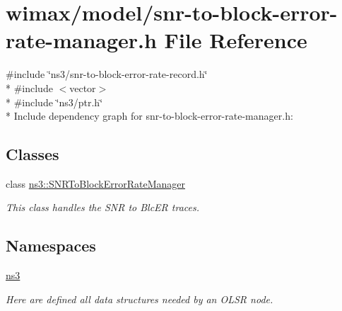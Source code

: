 \hypertarget{snr-to-block-error-rate-manager_8h}{}\section{wimax/model/snr-\/to-\/block-\/error-\/rate-\/manager.h File Reference}
\label{snr-to-block-error-rate-manager_8h}
{\ttfamily \#include \char`\"{}ns3/snr-\/to-\/block-\/error-\/rate-\/record.\+h\char`\"{}}\\*
{\ttfamily \#include $<$vector$>$}\\*
{\ttfamily \#include \char`\"{}ns3/ptr.\+h\char`\"{}}\\*
Include dependency graph for snr-\/to-\/block-\/error-\/rate-\/manager.h\+:
\subsection*{Classes}
\begin{DoxyCompactItemize}
\item 
class \hyperlink{classns3_1_1SNRToBlockErrorRateManager}{ns3\+::\+S\+N\+R\+To\+Block\+Error\+Rate\+Manager}
\begin{DoxyCompactList}\small\item\em This class handles the S\+NR to Blc\+ER traces. \end{DoxyCompactList}\end{DoxyCompactItemize}
\subsection*{Namespaces}
\begin{DoxyCompactItemize}
\item 
 \hyperlink{namespacens3}{ns3}
\begin{DoxyCompactList}\small\item\em Here are defined all data structures needed by an O\+L\+SR node. \end{DoxyCompactList}\end{DoxyCompactItemize}
